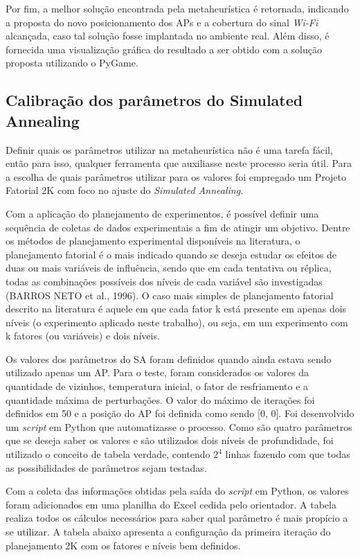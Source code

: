 \documentclass[
	12pt,				%
	openright,			%
	twoside,			%
	a4paper,			%
	english,			%
	french,				%
	spanish,			%
	brazil				%
	]{abntex2}
\begin{document}
Por fim, a melhor solução encontrada pela metaheurística é retornada, indicando a proposta do novo posicionamento dos APs e a cobertura do sinal \textit{Wi-Fi} alcançada, caso tal solução fosse implantada no ambiente real. Além disso, é fornecida uma visualização gráfica do resultado a ser obtido com a solução proposta utilizando o PyGame.


\subsection[Calibração dos parâmetros do Simulated Annealing]{Calibração dos parâmetros do Simulated Annealing}

Definir quais os parâmetros utilizar na metaheurística não é uma tarefa fácil, então para isso, qualquer ferramenta que auxiliasse neste processo seria útil. Para a escolha de quais parâmetros utilizar para os valores foi empregado um Projeto Fatorial 2K com foco no ajuste do \textit{Simulated Annealing}. 

Com a aplicação do planejamento de experimentos, é possível definir uma sequência de coletas de dados experimentais a fim de atingir um objetivo. Dentre os métodos de planejamento experimental disponíveis na literatura, o planejamento fatorial  é o mais indicado quando se deseja estudar os efeitos de duas ou mais variáveis de influência, sendo que em cada tentativa ou réplica, todas as combinações possíveis dos níveis de cada variável são investigadas (BARROS NETO et al., 1996). O caso mais simples de planejamento fatorial descrito na literatura é aquele em que cada fator k está presente em apenas dois níveis (o experimento aplicado neste trabalho), ou seja, em um experimento com k fatores (ou variáveis) e dois níveis.

Os valores dos parâmetros do SA foram definidos quando ainda estava sendo utilizado apenas um AP. Para o teste, foram considerados os valores da quantidade de vizinhos, temperatura inicial, o fator de resfriamento e a quantidade máxima de perturbações. O valor do máximo de iterações foi definidos em 50 e a posição do AP foi definida como sendo [0, 0]. Foi desenvolvido um \textit{script} em Python que automatizasse o processo. Como são quatro parâmetros que se deseja saber os valores e são utilizados dois níveis de profundidade, foi utilizado o conceito de tabela verdade, contendo $ 2^{4} $ linhas fazendo com que todas as possibilidades de parâmetros sejam testadas.

Com a coleta das informações obtidas pela saída do \textit{script} em Python, os valores foram adicionados em uma planilha do Excel cedida pelo orientador. A tabela realiza todos os cálculos necessários para saber qual parâmetro é mais propício a se utilizar. A tabela abaixo apresenta a configuração da primeira iteração do planejamento 2K com os fatores e níveis bem definidos.
	
\end{document}
